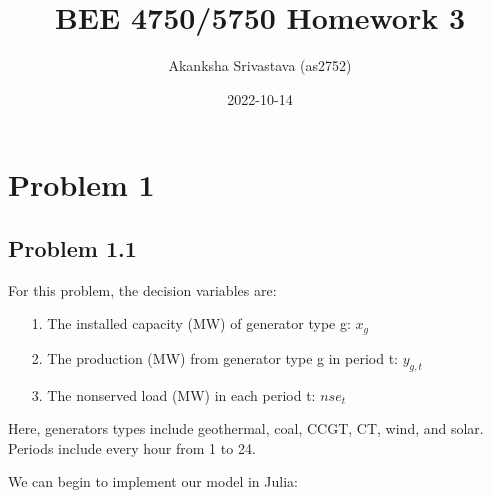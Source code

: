 \documentclass[12pt,a4paper]{article}
\title{ BEE 4750/5750 Homework 3 }
\author{ Akanksha Srivastava (as2752) }
\date{ 2022-10-14 }
\begin{document}
\maketitle





\section{Problem 1}
\subsection{Problem 1.1}
For this problem, the decision variables are: 

\begin{itemize}
\item[1. ] The installed capacity (MW) of generator type g: $x_g$


\item[2. ] The production (MW) from generator type g in period t: $y_{g,t}$


\item[3. ] The nonserved load (MW) in each period t: $nse_t$

\end{itemize}
Here, generators types include geothermal, coal, CCGT, CT, wind, and solar. Periods include every hour from 1 to 24.

We can begin to implement our model in Julia:
\end{document}
